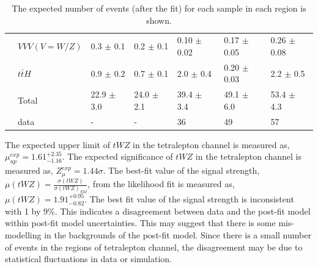 \begin{table}[h!]
{\begin{tabular}{|l|l|l|l|l|l|l|}
                        & $VVV (V = W/Z)$          & 0.3 $\pm$ 0.1     & 0.2 $\pm$ 0.1    & 0.10 $\pm$ 0.02     & 0.17 $\pm$ 0.05      & 0.26 $\pm$ 0.08  \\
                        & $t\bar{t}H$           & 0.9 $\pm$ 0.2       & 0.7 $\pm$ 0.1     & 2.0 $\pm$ 0.4      & 0.20 $\pm$ 0.03      & 2.2 $\pm$ 0.5     \\\hline
                        & Total         & 22.9 $\pm$ 3.0         & 24.0 $\pm$ 2.1       & 39.4 $\pm$ 3.4         & 49.1 $\pm$ 6.0         & 53.4 $\pm$ 4.3      \\ \hline
                        & data          & -                                         & -                                      & 36                                         & 49                                         & 57                                      \\ \hline
\end{tabular}}
\caption{The expected number of events (after the fit) for each sample in each region is shown.}
\label{tab:4Lep-PostFit-Yields}
\end{table}The expected upper limit of $tWZ$ in the tetralepton channel is measured as, $\mu_{up}^{exp} =   1.61^{+2.35}_{-1.16}$. The expected significance of $tWZ$ in the tetralepton channel is measured as, $Z_{\mu}^{exp} =   1.44\sigma$. The best-fit value of the signal strength, $\mu (tWZ)= \frac{\sigma(tWZ)}{\sigma(tWZ)_{SM}}$, from the likelihood fit is measured as, $\mu (tWZ) = 1.91^{+0.95}_{-0.82}$. The best fit value of the signal strength is inconsistent with 1 by $9\%$. This indicates a disagreement between data and the post-fit model within post-fit model uncertainties. This may suggest that there is some mis-modelling in the backgrounds of the post-fit model. Since there is a small number of events in the regions of tetralepton channel, the disagreement may be due to statistical fluctuations in data or simulation.\\

